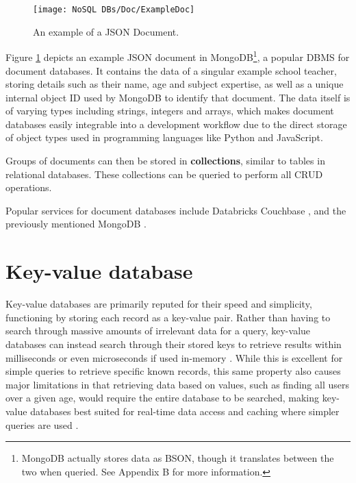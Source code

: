 
\begin{figure}[H]
    \centering
    \texttt{[image: NoSQL DBs/Doc/ExampleDoc]}
    \caption{An example of a JSON Document.\label{fig:ExampleDoc}}
\end{figure}

\noindent Figure \ref{fig:ExampleDoc} depicts an example JSON document in MongoDB\footnote{MongoDB actually stores data as BSON, though it translates between the two when queried. See Appendix B for more information.}, a popular DBMS
for document databases. It contains the data of a singular example school teacher, storing details such as their name, age and subject expertise, as well as a unique internal object ID used by MongoDB to identify that document. The data itself is of varying types including 
strings, integers and arrays, which makes document databases easily integrable into a development workflow due to the direct 
storage of object types used in programming languages like Python and JavaScript.

\para Groups of documents can then be stored in \textbf{collections}, similar to tables in relational databases. These collections can be queried 
to perform all CRUD operations. 


\para Popular services for document databases include Databricks \autocite{databricksDataAICompany2023} Couchbase \autocite{couchbaseCouchbaseBestFree}, and the previously mentioned MongoDB \autocite{mongodbDocumentDatabaseNoSQL}.


\section{Key-value database}
Key-value databases are primarily reputed for their speed and simplicity, functioning by storing each record as a key-value pair.
Rather than having to search through massive amounts of irrelevant data for a query, key-value databases can instead search 
through their stored keys to retrieve results within milliseconds or even microseconds if used in-memory \autocite{redisRedisFAQ}.
While this is excellent for simple queries to retrieve specific known records, this same property also causes major limitations in
that retrieving data based on values, such as finding all users over a given age, would require the entire database to be searched,
making key-value databases best suited for real-time data access and caching where simpler queries are used \autocite{mongodbWhatKeyValueDatabase}.

